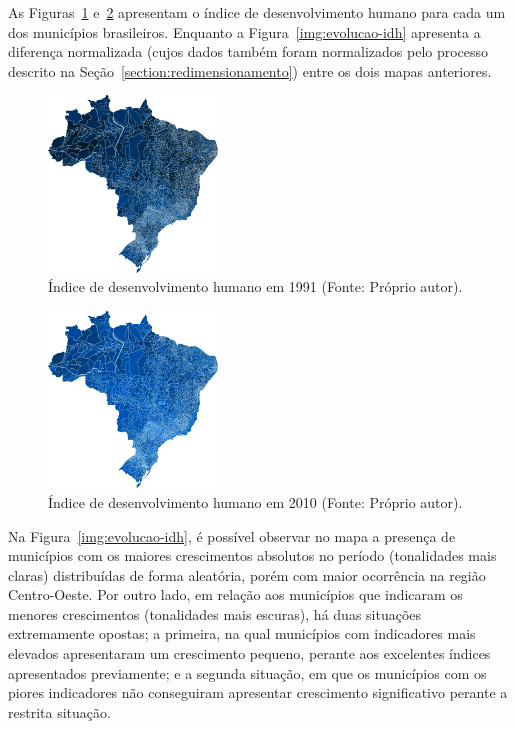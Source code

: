 \documentclass[conference]{IEEEtran}
\begin{document}
As Figuras~\ref{img:idh-1991} e~\ref{img:idh-2010} apresentam o índice de desenvolvimento humano para cada um dos municípios brasileiros. Enquanto a Figura~\ref{img:evolucao-idh} apresenta a diferença normalizada (cujos dados também foram normalizados pelo processo descrito na Seção~\ref{section:redimensionamento}) entre os dois mapas anteriores.

\begin{figure}[!ht]
\centering
\includegraphics[width=0.40\textwidth]{idh-1991.png}
\caption{Índice de desenvolvimento humano em 1991 (Fonte: Próprio autor).}
\label{img:idh-1991}
\end{figure}


\begin{figure}[!ht]
\centering
\includegraphics[width=0.40\textwidth]{idh-2010.png}
\caption{Índice de desenvolvimento humano em 2010 (Fonte: Próprio autor).}
\label{img:idh-2010}
\end{figure}


Na Figura~\ref{img:evolucao-idh}, é possível observar no mapa a presença de municípios com os maiores crescimentos absolutos no período (tonalidades mais claras) distribuídas de forma aleatória, porém com maior ocorrência na região Centro-Oeste. Por outro lado, em relação aos municípios que indicaram os menores crescimentos (tonalidades mais escuras), há duas situações extremamente opostas; a primeira, na qual municípios com indicadores mais elevados apresentaram um crescimento pequeno, perante aos excelentes índices apresentados previamente; e a segunda situação, em que os municípios com os piores indicadores não conseguiram apresentar crescimento significativo perante a restrita situação.
\end{document}
